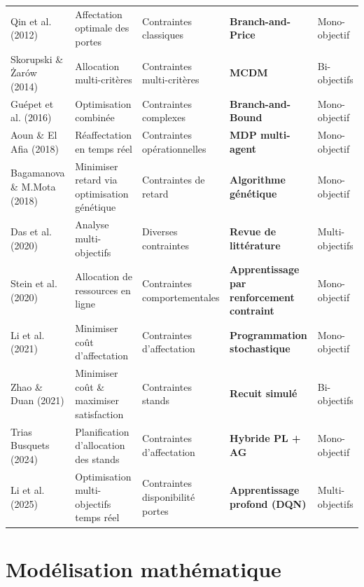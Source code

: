 \begin{table}[!htbp]
\begin{tabularx}{1.1\textwidth}{@{}p{3.3cm}p{3.2cm}p{3.7cm}p{3cm}p{2.3cm}@{}}
		Qin et al. (2012) \cite{Qin_2012} & Affectation optimale des portes & Contraintes classiques & \textbf{Branch-and-Price} & Mono-objectif \\
		Skorupski \& Żarów (2014) \cite{Skorupski_2014} & Allocation multi-critères & Contraintes multi-critères & \textbf{\ac{MCDM}} & Bi-objectifs \\
		Guépet et al. (2016) \cite{Guepet_2016} & Optimisation combinée & Contraintes complexes & \textbf{Branch-and-Bound} & Mono-objectif \\
		Aoun \& El Afia (2018) \cite{Aoun_2018} & Réaffectation en temps réel & Contraintes opérationnelles & \textbf{MDP multi-agent} & Mono-objectif \\
		Bagamanova \& M.Mota (2018)\cite{Bagamanova_2018} & Minimiser retard via optimisation génétique & Contraintes de retard & \textbf{Algorithme génétique} & Mono-objectif \\
		Das et al.(2020) \cite{Das_2020} & Analyse multi-objectifs & Diverses contraintes & \textbf{Revue de littérature} & Multi-objectifs \\
		Stein et al. (2020) \cite{Stein_2020} & Allocation de ressources en ligne & Contraintes comportementales & \textbf{Apprentissage par renforcement contraint} & Mono-objectif \\
		Li et al. (2021) \cite{Li_2021} & Minimiser coût d’affectation & Contraintes d’affectation & \textbf{Programmation stochastique} & Mono-objectif \\
		Zhao \& Duan (2021) \cite{Zhao_2021} & Minimiser coût \& maximiser satisfaction & Contraintes stands & \textbf{Recuit simulé} & Bi-objectifs \\
		Trias Busquets (2024) \cite{NilBusquetsTrias} & Planification d’allocation des stands & Contraintes d’affectation & \textbf{Hybride PL + AG} & Mono-objectif \\
		Li et al. (2025) \cite{Li_2025} & Optimisation multi-objectifs temps réel & Contraintes disponibilité portes & \textbf{Apprentissage profond (DQN)} & Multi-objectifs \\
		\bottomrule
	\end{tabularx}

\end{table}
\vspace{-1em}
\section{Modélisation mathématique}
\vspace{-1em}
